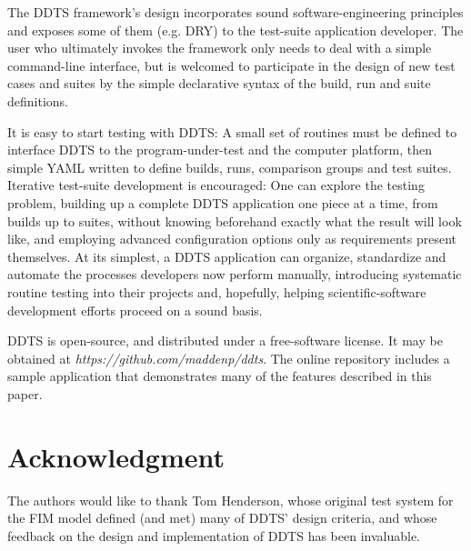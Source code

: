 \documentclass[conference]{IEEEtran}
\begin{document}
The DDTS framework's design incorporates sound software-engineering principles and exposes some of them (e.g. DRY) to the test-suite application developer. The user who ultimately invokes the framework only needs to deal with a simple command-line interface, but is welcomed to participate in the design of new test cases and suites by the simple declarative syntax of the build, run and suite definitions.

It is easy to start testing with DDTS: A small set of routines must be defined to interface DDTS to the program-under-test and the computer platform, then simple YAML written to define builds, runs, comparison groups and test suites. Iterative test-suite development is encouraged: One can explore the testing problem, building up a complete DDTS application one piece at a time, from builds up to suites, without knowing beforehand exactly what the result will look like, and employing advanced configuration options only as requirements present themselves. At its simplest, a DDTS application can organize, standardize and automate the processes developers now perform manually, introducing systematic routine testing into their projects and, hopefully, helping scientific-software development efforts proceed on a sound basis.

DDTS is open-source, and distributed under a free-software license. It may be obtained at \emph{https://github.com/maddenp/ddts}. The online repository includes a sample application that demonstrates many of the features described in this paper.

\section*{Acknowledgment}

The authors would like to thank Tom Henderson, whose original test system for the FIM model defined (and met) many of DDTS' design criteria, and whose feedback on the design and implementation of DDTS has been invaluable.
\end{document}
